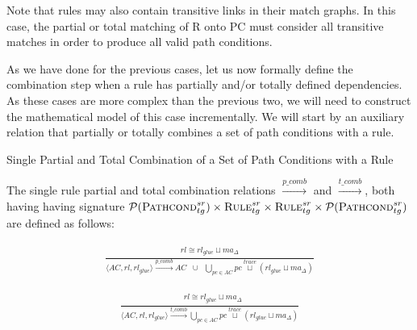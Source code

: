 Note that rules may also contain transitive links in their match graphs. In this case, the partial or total matching of R onto PC must consider all transitive matches in order to produce all valid path conditions.

As we have done for the previous cases, let us now formally define the combination step when a rule has partially and/or totally defined dependencies. As these cases are more complex than the previous two, we will need to construct the mathematical model of this case incrementally. We will start by an auxiliary relation that partially or totally combines a set of path conditions with a rule.

\begin{definition}{Single Partial and Total Combination of a Set of Path Conditions with a Rule\\}
\label{def:comb_path_cond_rule_single}
% 
% 
%





The single rule partial and total combination relations $\stackrel{p\_comb}{\rightarrow}$ and $\stackrel{t\_comb}{\rightarrow}$, both having having signature $\mathcal{P}(\textsc{Pathcond}^{sr}_{tg}) \times \textsc{Rule}^{sr}_{tg} \times \textsc{Rule}^{sr}_{tg} \times \mathcal{P}(\textsc{Pathcond}^{sr}_{tg})$ are defined as follows:


\begin{align}
\label{eq:pcomb}
\frac{\begin{array}{ll}
rl\cong rl_{glue}\sqcup ma_{\Delta}
\end{array}}
{\langle AC,rl,rl_{glue}\rangle \xrightarrow{p\_comb} AC\;\;\cup\;\; \bigcup_{pc\in AC} pc\stackrel{trace}{\sqcup} (rl_{glue} \sqcup ma_{\Delta})}
\end{align}


\begin{align}
\label{eq:tcomb}
\frac{\begin{array}{ll}&
rl\cong rl_{glue}\sqcup ma_{\Delta}
\end{array}}
{\langle AC,rl,rl_{glue}\rangle \xrightarrow{t\_comb} \bigcup_{pc\in AC} pc\stackrel{trace}{\sqcup} (rl_{glue} \sqcup ma_{\Delta})}
\end{align}

\end{definition}


